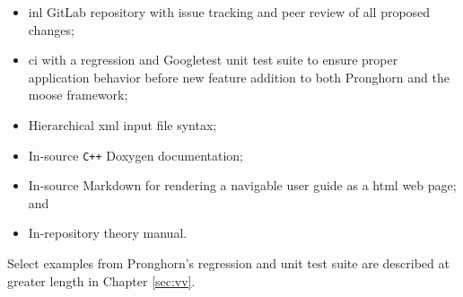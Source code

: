 \begin{itemize}
\itemsep0.3em
\item \gls{inl} GitLab repository with issue tracking and peer review of all proposed changes;
\item \gls{ci} with a regression and Googletest unit test suite to ensure proper application behavior before new feature addition to both Pronghorn and the \gls{moose} framework;
\item Hierarchical \gls{xml} input file syntax;
\item In-source \texttt{C++} Doxygen documentation;
\item In-source Markdown for rendering a navigable user guide as a \gls{html} web page; and
\item In-repository theory manual.
\end{itemize}

Select examples from Pronghorn's regression and unit test suite are described at greater length in Chapter \ref{sec:vv}.
